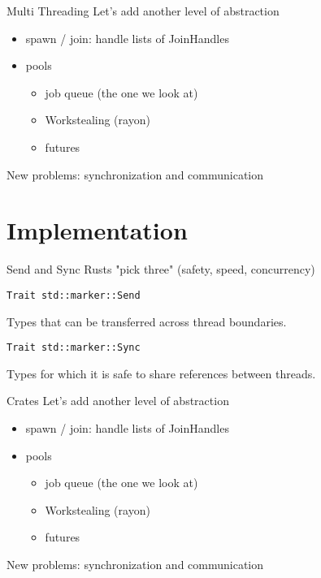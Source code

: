 \documentclass[aspectratio=1610,t]{beamer}
\begin{document}
\begin{frame}[fragile]{Multi Threading}
Let's add another level of abstraction
\begin{itemize}
  \item spawn / join: handle lists of JoinHandles
  \item pools \begin{itemize}
      \item job queue (the one we look at)
      \item Workstealing (rayon)
      \item futures
    \end{itemize}
\end{itemize}

New problems: synchronization and communication

\end{frame}

{
\section{Implementation}
}

\begin{frame}[fragile]{Send and Sync}
Rusts "pick three" (safety, speed, concurrency)

\begin{verbatim}
Trait std::marker::Send
\end{verbatim}
Types that can be transferred across thread boundaries.

\begin{verbatim}
Trait std::marker::Sync
\end{verbatim}
Types for which it is safe to share references between threads.

\end{frame}

\begin{frame}[fragile]{Crates}
Let's add another level of abstraction
\begin{itemize}
  \item spawn / join: handle lists of JoinHandles
  \item pools \begin{itemize}
      \item job queue (the one we look at)
      \item Workstealing (rayon)
      \item futures
    \end{itemize}
\end{itemize}

New problems: synchronization and communication

\end{frame}
\end{document}
